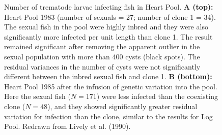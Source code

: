 \documentclass[
  letterpaper,
]{book}
\begin{document}
\begin{figure}


\caption[Number of trematode larvae infecting fish in Heart
Pool]{\label{fig-5-3}Number of trematode larvae infecting fish in Heart
Pool. \textbf{A (top):} Heart Pool 1983 (number of sexuals = 27; number
of clone 1 = 34). The sexual fish in the pool were highly inbred and
they were also significantly more infected per unit length than clone 1.
The result remained significant after removing the apparent outlier in
the sexual population with more than 400 cysts (black spots). The
residual variances in the number of cysts were not significantly
different between the inbred sexual fish and clone 1. \textbf{B
(bottom):} Heart Pool 1985 after the infusion of genetic variation into
the pool. Here the sexual fish (\(N=171\)) were less infected than the
coexisting clone (\(N=48\)), and they showed significantly greater
residual variation for infection than the clone, similar to the results
for Log Pool. Redrawn from Lively et al. (1990).}

\end{figure}%
\end{document}
